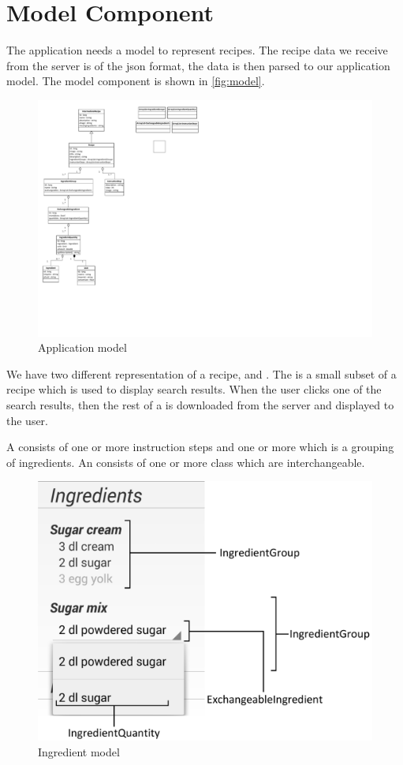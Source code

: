 \pagebreak
\section{Model Component}

The application needs a model to represent recipes. The recipe data we receive from the server is of the \ac{json} format, the data is then parsed to our application model. The model component is shown in \autoref{fig:model}.

\begin{figure}[H]
\centering
\includegraphics[width=0.67\linewidth, page=2]{img/model.pdf}
\caption{Application model}
\label{fig:model}
\end{figure}
We have two different representation of a recipe,  and . The  is a small subset of a recipe which is used to display search results. When the user clicks one of the search results, then the rest of a  is downloaded from the server and displayed to the user.

A  consists of one or more instruction steps and one or more \linebreak{} which is a grouping of ingredients. An  consists of one or more  class which are interchangeable. 

\begin{figure}[H]
\centering
\includegraphics[width=0.6\linewidth]{img/ingredients.pdf}
\caption{Ingredient model}
\label{fig:ingredients}
\end{figure}

